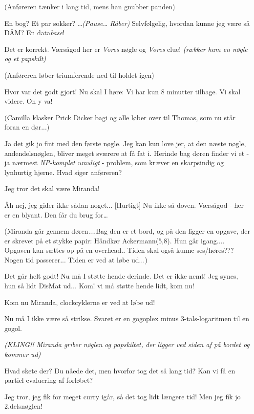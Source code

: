 \documentclass{article}
\begin{document}
\begin{sketch}
\scene (Anføreren tænker i lang tid, mens han gnubber panden)

 En bog? Et par sokker? \ldots {\em (Pause\ldots
Råber) \/} Selvfølgelig, hvordan kunne jeg være så DÅM? En
data{\em base}\/!

 Det er korrekt. Værsågod her er {\em Vores\/} nøgle og
{\em Vores\/} clue! {\em (rækker ham en nøgle og et papskilt)} 

\scene (Anføreren løber triumferende ned til holdet igen)

 Hvor var det godt gjort! Nu skal I høre: Vi har kun 8 minutter
tilbage. Vi skal videre. On y va!

\scene (Camilla klasker Prick Dicker bagi og alle løber over til Thomas,
som nu står foran en dør...)

 Ja det gik jo fint med den første nøgle. Jeg kan kun love jer, at
den næste nøgle, andendelsnøglen, bliver meget sværere at få fat i.
Herinde bag døren finder vi et - ja nærmest {\em NP-komplet umuligt\/} -
problem, som kræver en skarpsindig og lynhurtig hjerne. Hvad siger
anføreren?

 Jeg tror det skal være Miranda!

 Åh nej, jeg gider ikke sådan noget...
 [Hurtigt] Nu ikke så doven. Værsågod - her er en blyant.
Den får du brug for\ldots

\scene (Miranda går gennem døren....Bag den er et bord, og på den ligger en
opgave, der er skrevet på et stykke papir: Håndkør Ackermann(5,8). Hun
går igang.... Opgaven kan sættes op på en overhead.. Tiden skal også
kunne ses/høres??? Nogen tid passerer... Tiden er ved at løbe ud...)

 Det går helt godt! Nu må I støtte hende derinde. Det er
ikke nemt! Jeg synes, hun så lidt DisMat ud... Kom! vi må støtte hende
lidt, kom nu!

 Kom nu Miranda, clockcyklerne er ved at løbe ud!

 Nu må I ikke være så strikse. Svaret er en gogoplex
minus 3-tals-logaritmen til en gogol.

{\em (KLING!! Miranda griber nøglen og papskiltet, der ligger ved siden af
  på bordet og kommer ud)}

 Hvad skete der? Du nåede det, men hvorfor tog det så lang
tid? Kan vi få en partiel evaluering af forløbet?

 Jeg tror, jeg fik for meget curry igår, så det tog lidt
længere tid! Men jeg fik jo 2.delsnøglen!


\end{sketch}
\end{document}
